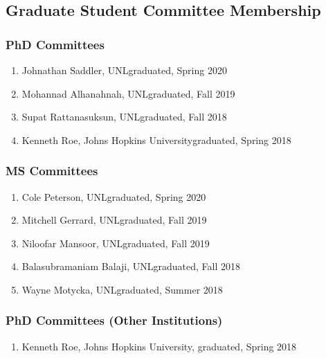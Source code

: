 \documentclass[11pt]{article}
\begin{document}
{  \subsection{Graduate Student Committee Membership}
  \subsubsection{PhD Committees}
  \begin{enumerate}
  \item Johnathan Saddler, UNL\hfill graduated, Spring 2020
  \item Mohannad Alhanahnah, UNL\hfill graduated, Fall 2019
  \item Supat Rattanasuksun, UNL\hfill graduated, Fall 2018
  \item Kenneth Roe,  Johns Hopkins University\hfill graduated, Spring 2018
  \end{enumerate}

  \subsubsection{MS Committees}
  \begin{enumerate}
  \item Cole Peterson, UNL\hfill graduated, Spring 2020
  \item Mitchell Gerrard, UNL\hfill graduated, Fall 2019
  \item Niloofar Mansoor, UNL\hfill graduated, Fall 2019
  \item Balasubramaniam Balaji, UNL\hfill graduated, Fall 2018
  \item Wayne Motycka, UNL\hfill graduated, Summer 2018
  \end{enumerate}


  \subsubsection{PhD Committees (Other Institutions)}
  \begin{enumerate}
  \item Kenneth Roe,  Johns Hopkins University,  graduated, Spring 2018
  \end{enumerate}

}
\end{document}
